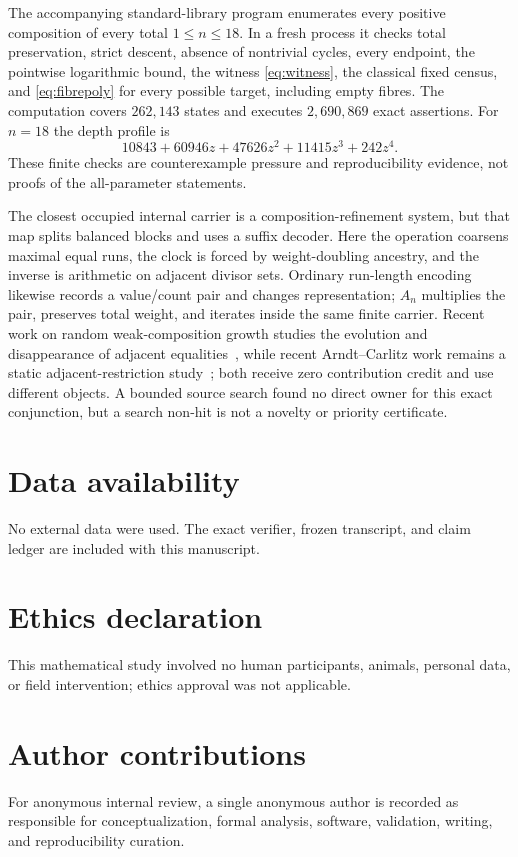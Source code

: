 \documentclass[a4paper,10pt]{amsart}
\theoremstyle{remark}
\begin{document}
The accompanying standard-library program enumerates every positive
composition of every total $1\le n\le18$.  In a fresh process it checks total
preservation, strict descent, absence of nontrivial cycles, every endpoint,
the pointwise logarithmic bound, the witness \eqref{eq:witness}, the classical
fixed census, and \eqref{eq:fibrepoly} for every possible target, including
empty fibres.  The computation covers $262{,}143$ states and executes
$2{,}690{,}869$ exact assertions.  For $n=18$ the depth profile is
\[
 10843+60946z+47626z^2+11415z^3+242z^4.
\]
These finite checks are counterexample pressure and reproducibility evidence,
not proofs of the all-parameter statements.

The closest occupied internal carrier is a composition-refinement system, but
that map splits balanced blocks and uses a suffix decoder.  Here the operation
coarsens maximal equal runs, the clock is forced by weight-doubling ancestry,
and the inverse is arithmetic on adjacent divisor sets.  Ordinary run-length
encoding likewise records a value/count pair and changes representation;
$A_n$ multiplies the pair, preserves total weight, and iterates inside the same
finite carrier.  Recent work on random weak-composition growth studies the
evolution and disappearance of adjacent equalities~\cite{BevanThrelfall2025},
while recent Arndt--Carlitz work remains a static adjacent-restriction
study~\cite{HopkinsTangboonduangjit2026}; both receive zero contribution
credit and use different objects.  A bounded source search found no direct
owner for this exact conjunction, but a search non-hit is not a novelty or
priority certificate.

\section*{Data availability}
No external data were used.  The exact verifier, frozen transcript, and claim
ledger are included with this manuscript.

\section*{Ethics declaration}
This mathematical study involved no human participants, animals, personal
data, or field intervention; ethics approval was not applicable.

\section*{Author contributions}
For anonymous internal review, a single anonymous author is recorded as
responsible for conceptualization, formal analysis, software, validation,
writing, and reproducibility curation.
\end{document}
